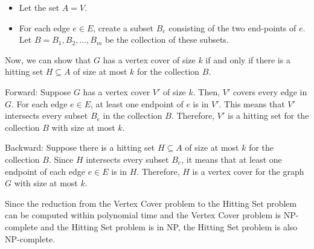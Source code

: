 \documentclass[12pt]{article}
\begin{document}
\begin{itemize}
    \item Let the set $A = V$.
    \item For each edge $e \in E$, create a subset $B_e$ consisting of the two end-points of $e$. Let $B = {B_1, B_2, \ldots, B_m}$ be the collection of these subsets.
\end{itemize}

Now, we can show that $G$ has a vertex cover of size $k$ if and only if there is a hitting set $H \subseteq A$ of size at most $k$ for the collection $B$.

Forward: Suppose $G$ has a vertex cover $V'$ of size $k$. Then, $V'$ covers every edge in $G$. For each edge $e \in E$, at least one endpoint of $e$ is in $V'$. This means that $V'$ intersects every subset $B_e$ in the collection $B$. Therefore, $V'$ is a hitting set for the collection $B$ with size at most $k$.

Backward: Suppose there is a hitting set $H \subseteq A$ of size at most $k$ for the collection $B$. Since $H$ intersects every subset $B_e$, it means that at least one endpoint of each edge $e \in E$ is in $H$. Therefore, $H$ is a vertex cover for the graph $G$ with size at most $k$.

Since the reduction from the Vertex Cover problem to the Hitting Set problem can be computed within polynomial time and the Vertex Cover problem is NP-complete and the Hitting Set problem is in NP, the Hitting Set problem is also NP-complete.
\end{document}
